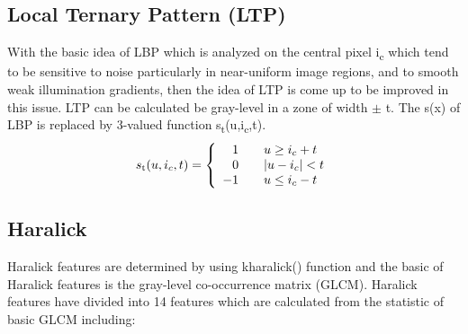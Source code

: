 \documentclass[review]{elsarticle}
\begin{document}
\subsection{Local Ternary Pattern (LTP)}
With the basic idea of LBP which is analyzed on the central pixel i\textsubscript{c} which tend to be sensitive to noise particularly in near-uniform image regions, and to smooth weak illumination gradients, then the idea of LTP is come up to be improved in this issue.  LTP can be calculated be gray-level in a zone of width $\pm$ t. The s(x) of LBP is replaced by 3-valued function s\textsubscript{t}(u,i\textsubscript{c},t). 
\begin{equation}
s\textsubscript{t}(u,i_c,t) = \left\{ \begin{array}{rcl}
1 & 
& u\geq i_c+t \\ 0 &  & |u - i_c| <t \\
-1 & & u \leq i_c -t

\end{array}\right.
\end{equation}

 \subsection{Haralick}
Haralick features are determined by using kharalick() function and the basic of Haralick features is the gray-level co-occurrence matrix (GLCM). Haralick features have divided into 14 features which are calculated from the statistic of basic GLCM including: 
\end{document}

